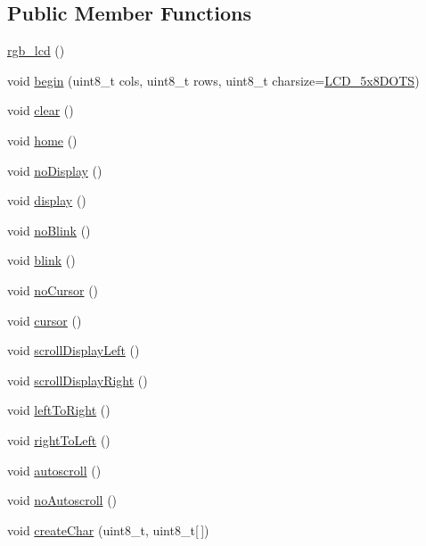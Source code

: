 \subsection*{Public Member Functions}
\begin{DoxyCompactItemize}
\item 
\hyperlink{classrgb__lcd_ac651f214e977bc15e4f4f4bfc921ae6a}{rgb\+\_\+lcd} ()
\item 
void \hyperlink{classrgb__lcd_a828ec16645effff091b11356de90f016}{begin} (uint8\+\_\+t cols, uint8\+\_\+t rows, uint8\+\_\+t charsize=\hyperlink{rgb__lcd_8h_a9ef57e724c1b846dae0f531aff6fb464}{L\+C\+D\+\_\+5x8\+D\+O\+T\+S})
\item 
void \hyperlink{classrgb__lcd_a3be1a6075d03e10beff572c7303d6205}{clear} ()
\item 
void \hyperlink{classrgb__lcd_a3cb99ab37a932a7279605033a1f3627a}{home} ()
\item 
void \hyperlink{classrgb__lcd_ae74196f203857b5a0886668263cb6b0a}{no\+Display} ()
\item 
void \hyperlink{classrgb__lcd_aaa29ca8413bdc5e558f2f24575a0884b}{display} ()
\item 
void \hyperlink{classrgb__lcd_a2da54a37f1f57cec4f41a6f9415b278b}{no\+Blink} ()
\item 
void \hyperlink{classrgb__lcd_a9d7a1aca56d3b677eac640909e44317c}{blink} ()
\item 
void \hyperlink{classrgb__lcd_afcfef50ded29ec34468e56c1a578ad39}{no\+Cursor} ()
\item 
void \hyperlink{classrgb__lcd_a624fa4814b8d8e328cbaa1e030c7e5b6}{cursor} ()
\item 
void \hyperlink{classrgb__lcd_a13ec4ba249962dfa70e2296cbbbb59b7}{scroll\+Display\+Left} ()
\item 
void \hyperlink{classrgb__lcd_acba95981c737747a2bbf74698145dc85}{scroll\+Display\+Right} ()
\item 
void \hyperlink{classrgb__lcd_aa6a10cee260f41c76fc3ec76797ae3e1}{left\+To\+Right} ()
\item 
void \hyperlink{classrgb__lcd_ad023821ee7042a6c9602741febda6db6}{right\+To\+Left} ()
\item 
void \hyperlink{classrgb__lcd_a6280037a96fa1f40c3cc447e8c548076}{autoscroll} ()
\item 
void \hyperlink{classrgb__lcd_acda0feac43a242781f72e21e6f474d50}{no\+Autoscroll} ()
\item 
void \hyperlink{classrgb__lcd_a2904b44e55a03d5ae11d2dd1e940725e}{create\+Char} (uint8\+\_\+t, uint8\+\_\+t\mbox{[}$\,$\mbox{]})

\end{DoxyCompactItemize}
